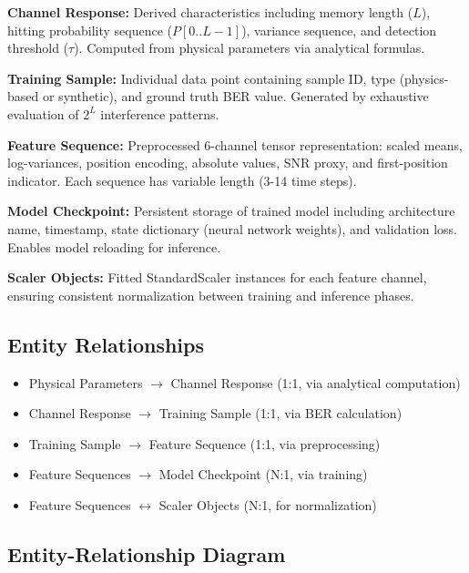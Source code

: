 \documentclass[a4paper,12pt]{report}
\begin{document}
\textbf{Channel Response:}
Derived characteristics including memory length ($L$), hitting probability sequence ($P[0..L-1]$), variance sequence, and detection threshold ($\tau$). Computed from physical parameters via analytical formulas.

\textbf{Training Sample:}
Individual data point containing sample ID, type (physics-based or synthetic), and ground truth BER value. Generated by exhaustive evaluation of $2^L$ interference patterns.

\textbf{Feature Sequence:}
Preprocessed 6-channel tensor representation: scaled means, log-variances, position encoding, absolute values, SNR proxy, and first-position indicator. Each sequence has variable length (3-14 time steps).

\textbf{Model Checkpoint:}
Persistent storage of trained model including architecture name, timestamp, state dictionary (neural network weights), and validation loss. Enables model reloading for inference.

\textbf{Scaler Objects:}
Fitted StandardScaler instances for each feature channel, ensuring consistent normalization between training and inference phases.

\subsection{Entity Relationships}

\begin{itemize}
    \item Physical Parameters $\rightarrow$ Channel Response (1:1, via analytical computation)
    \item Channel Response $\rightarrow$ Training Sample (1:1, via BER calculation)
    \item Training Sample $\rightarrow$ Feature Sequence (1:1, via preprocessing)
    \item Feature Sequences $\rightarrow$ Model Checkpoint (N:1, via training)
    \item Feature Sequences $\leftrightarrow$ Scaler Objects (N:1, for normalization)
\end{itemize}

\subsection{Entity-Relationship Diagram}
\end{document}
